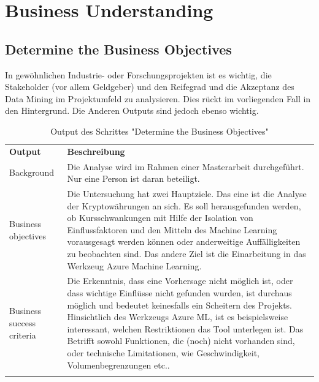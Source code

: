 \section{Business Understanding}
\subsection{Determine the Business Objectives}
In  gewöhnlichen Industrie- oder Forschungsprojekten ist es wichtig, die Stakeholder (vor allem Geldgeber) und den Reifegrad und die Akzeptanz des Data Mining im Projektumfeld zu analysieren. Dies rückt im vorliegenden Fall in den Hintergrund. Die Anderen Outputs sind jedoch ebenso wichtig.

\begin{longtable}[H]{|p{}|p{12cm}|}
\hline
\textbf{Output} & \textbf{Beschreibung} \\ 
\hhline{==}
Background & Die Analyse wird im Rahmen einer Masterarbeit durchgeführt. Nur eine Person ist daran beteiligt. \\
\hline
Business objectives & Die Untersuchung hat zwei Hauptziele. Das eine ist die Analyse der Kryptowährungen an sich. Es soll herausgefunden werden, ob Kursschwankungen mit Hilfe der Isolation von Einflussfaktoren und den Mitteln des Machine Learning vorausgesagt werden können oder anderweitige Auffälligkeiten zu beobachten sind. Das andere Ziel ist die Einarbeitung in das Werkzeug Azure Machine Learning. \\
\hline
Business success criteria & Die Erkenntnis, dass eine Vorhersage nicht möglich ist, oder dass wichtige Einflüsse nicht gefunden wurden, ist durchaus möglich und bedeutet keinesfalls ein Scheitern des Projekts. Hinsichtlich des Werkzeugs Azure ML, ist es beispielsweise interessant, welchen Restriktionen das Tool unterlegen ist. Das Betrifft sowohl Funktionen, die (noch) nicht vorhanden sind, oder technische Limitationen, wie Geschwindigkeit, Volumenbegrenzungen etc..\\
\hline
\caption{Output des Schrittes "Determine the Business Objectives"}
\end{longtable}

